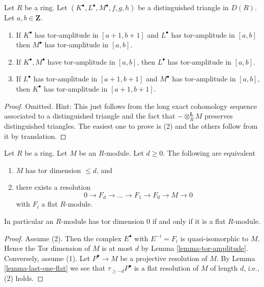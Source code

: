 \begin{lemma}
\label{lemma-cone-tor-amplitude}
Let $R$ be a ring.
Let $(K^\bullet, L^\bullet, M^\bullet, f, g, h)$ be a distinguished
triangle in $D(R)$. Let $a, b \in \mathbf{Z}$.
\begin{enumerate}
\item If $K^\bullet$ has tor-amplitude in $[a + 1, b + 1]$ and
$L^\bullet$ has tor-amplitude in $[a, b]$ then $M^\bullet$ has
tor-amplitude in $[a, b]$.
\item If $K^\bullet, M^\bullet$ have tor-amplitude in $[a, b]$, then
$L^\bullet$ has tor-amplitude in $[a, b]$.
\item If $L^\bullet$ has tor-amplitude in $[a + 1, b + 1]$
and $M^\bullet$ has tor-amplitude in $[a, b]$, then
$K^\bullet$ has tor-amplitude in $[a + 1, b + 1]$.
\end{enumerate}
\end{lemma}

\begin{proof}
Omitted. Hint: This just follows from the long exact cohomology sequence
associated to a distinguished triangle and the fact that
$- \otimes_R^{\mathbf{L}} M$ preserves distinguished triangles.
The easiest one to prove is (2) and the others follow from it by
translation.
\end{proof}

\begin{lemma}
\label{lemma-tor-dimension}
Let $R$ be a ring. Let $M$ be an $R$-module.
Let $d \geq 0$. The following are equivalent
\begin{enumerate}
\item $M$ has tor dimension $\leq d$, and
\item there exists a resolution
$$
0 \to F_d \to \ldots \to F_1 \to F_0 \to M \to 0
$$
with $F_i$ a flat $R$-module.
\end{enumerate}
In particular an $R$-module has tor dimension $0$ if and only if
it is a flat $R$-module.
\end{lemma}

\begin{proof}
Assume (2). Then the complex $E^\bullet$ with $E^{-i} = F_i$
is quasi-isomorphic to $M$. Hence the Tor dimension of $M$ is
at most $d$ by
Lemma \ref{lemma-tor-amplitude}.
Conversely, assume (1). Let $P^\bullet \to M$ be a projective
resolution of $M$. By
Lemma \ref{lemma-last-one-flat}
we see that $\tau_{\geq -d}P^\bullet$ is a flat resolution of
$M$ of length $d$, i.e., (2) holds.
\end{proof}

